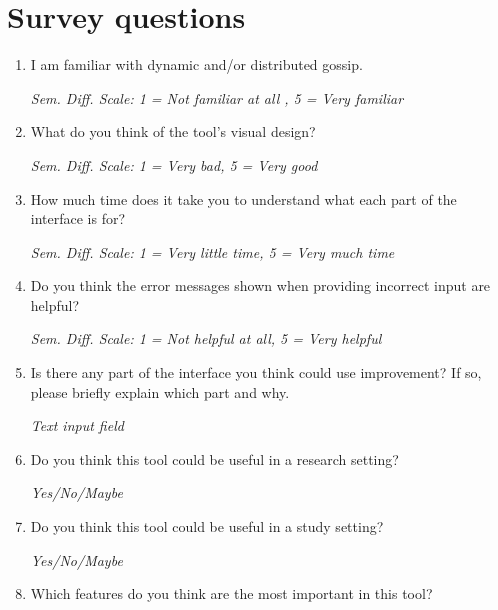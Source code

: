 
\section{Survey questions}\label{ap:survey}

\begin{enumerate}
    \item I am familiar with dynamic and/or distributed gossip.

    \textit{Sem. Diff. Scale: 1 = Not familiar at all , 5 = Very familiar}

    \item What do you think of the tool's visual design?

    \textit{Sem. Diff. Scale: 1 = Very bad, 5 = Very good}

    \item How much time does it take you to understand what each part of the interface is for?

    \textit{Sem. Diff. Scale: 1 = Very little time, 5 = Very much time}

    \item Do you think the error messages shown when providing incorrect input are helpful?

    \textit{Sem. Diff. Scale: 1 = Not helpful at all, 5 = Very helpful}

    \item Is there any part of the interface you think could use improvement? If so, please briefly explain which part and why.

    \textit{Text input field}

    \item Do you think this tool could be useful in a research setting?

    \textit{Yes/No/Maybe}

    \item Do you think this tool could be useful in a study setting?

    \textit{Yes/No/Maybe}

    \item Which features do you think are the most important in this tool?


\end{enumerate}
